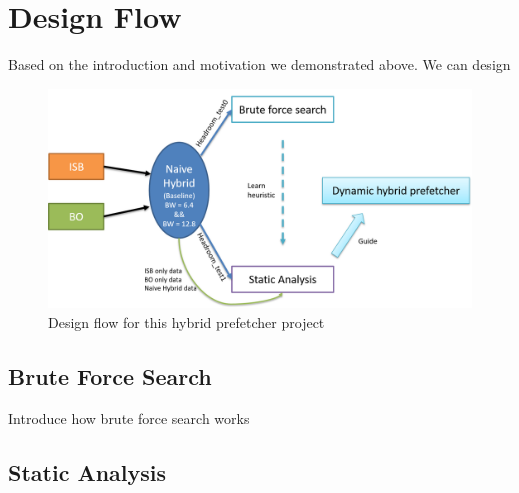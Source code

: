 \section{Design Flow}
\label{sec:designflow}

Based on the introduction and motivation we demonstrated above. We can design 
\begin{figure}[ht!]
	\centering
	\includegraphics[width=1.0\textwidth]{images/design_flow.png}
	\caption{Design flow for this hybrid prefetcher project}
	\label{fig:design_flow}
\end{figure}

  \subsection{Brute Force Search}
  \label{sec:bruteforcesearch}

  Introduce how brute force search works

  \subsection{Static Analysis}
  \label{sec:staticanalysis}
